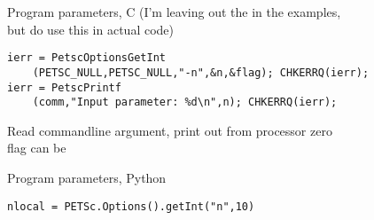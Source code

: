 \begin{details}
\begin{frame}[containsverbatim]{Program parameters, C}
(I'm leaving out the  in the examples,\\
but do use this in actual code)
\begin{verbatim}
ierr = PetscOptionsGetInt
    (PETSC_NULL,PETSC_NULL,"-n",&n,&flag); CHKERRQ(ierr);
ierr = PetscPrintf
    (comm,"Input parameter: %d\n",n); CHKERRQ(ierr);
\end{verbatim}
Read commandline argument, print out from processor zero\\
flag can be 
\end{frame}

\end{details}

\lstset{language=Python}
\begin{frame}[containsverbatim]{Program parameters, Python}
\begin{lstlisting}
nlocal = PETSc.Options().getInt("n",10)
\end{lstlisting}
\end{frame}
\lstset{language=C}

\endinput

\frame[containsverbatim]{\frametitle{, C}
\begin{verbatim}
\end{verbatim}
}
\frame[containsverbatim]{\frametitle{, F}
\begin{verbatim}
\end{verbatim}
}
